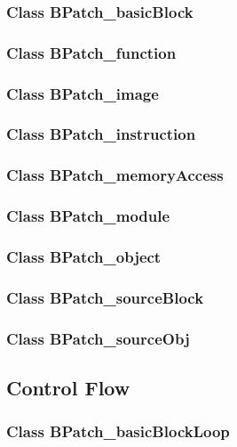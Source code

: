 \documentclass{article}
\begin{document}
    \subsubsection{Class BPatch\_basicBlock}
      
    \subsubsection{Class BPatch\_function}
      
    \subsubsection{Class BPatch\_image}
      
    \subsubsection{Class BPatch\_instruction}
      
    \subsubsection{Class BPatch\_memoryAccess}
      
    \subsubsection{Class BPatch\_module}
      
    \subsubsection{Class BPatch\_object}
      
    \subsubsection{Class BPatch\_sourceBlock}
      
    \subsubsection{Class BPatch\_sourceObj}
      

  \subsection{Control Flow}

    \subsubsection{Class BPatch\_basicBlockLoop}
      
\end{document}
